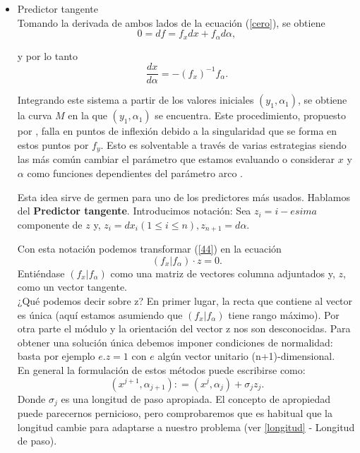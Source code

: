 \begin{itemize}
	\item Predictor tangente\\
Tomando la derivada de ambos lados de la ecuación (\ref{cero}), se obtiene
\begin{equation}
0 = df = f_x dx + f_\alpha d\alpha, \label{44}
\end{equation} 

y por lo tanto
\[\frac{dx}{d\alpha}= -(f_x)^{-1}f_\alpha. \]

Integrando este sistema a partir de los valores iniciales $(y_1, \alpha_1)$, se obtiene
la curva $M$ en la que $(y_1, \alpha_1)$ se encuentra. Este procedimiento, propuesto por \cite{georg}, falla en puntos de inflexión debido a la singularidad que se forma en estos puntos por $f_y$. Esto es solventable a través de varias estrategias siendo las más común cambiar el parámetro que estamos evaluando o considerar $x$ y $\alpha$ como funciones dependientes del parámetro arco \cite{prac}.

Esta idea sirve de germen para uno de los predictores más usados. Hablamos del \textbf{Predictor tangente}. Introducimos notación: Sea $z_i = i-esima$ componente de $z$ y, $ z_i = dx_i (1 \leq i \leq n), z_{n+1}= d\alpha$.

Con esta notación podemos transformar (\ref{44}) en la ecuación
\begin{equation}
(f_x | f_\alpha)\cdot z = 0.
\end{equation}
Entiéndase $(f_x | f_\alpha)$ como una matriz de vectores columna adjuntados y, $z$, como un vector tangente.\\
¿Qué podemos decir sobre z? En primer lugar, la recta que contiene al vector es única (aquí estamos asumiendo que $(f_x | f_\alpha)$ tiene rango máximo). Por otra parte el módulo y la orientación del vector z nos son desconocidas. Para obtener una solución única debemos imponer condiciones de normalidad: basta por ejemplo $e. z = 1$ con $e$ algún vector unitario (n+1)-dimensional.\\

En general la formulación de estos métodos puede escribirse como:
\begin{equation}
(x^{j + 1}, \alpha_{j + 1}): = (x^j, \alpha_j) + \sigma_j z_j. \label{normalizao}
\end{equation} 
 Donde $\sigma_j$ es una longitud de paso apropiada. El concepto de apropiedad puede parecernos pernicioso, pero comprobaremos que es habitual que la longitud cambie para adaptarse a nuestro problema (ver \ref{longitud} - Longitud de paso).


\end{itemize}

